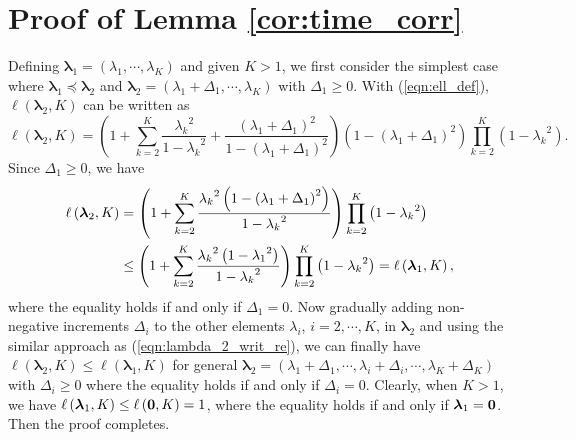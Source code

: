 \documentclass[12pt,onecolumn,draftcls]{IEEEtran}
\newcommand{\bs}{\boldsymbol}
\begin{document}
\section{Proof of Lemma \ref{cor:time_corr}} \label{app:proo_cor}
Defining ${\bs{\lambda }_1} = \left( {{\lambda _1}, \cdots,{\lambda _K}} \right)$ and given $K>1$, we first consider the simplest case where $\bs{\lambda}_1 \preceq \bs{\lambda}_2$ and ${\bs{\lambda }_2} = \left( {{\lambda _1}+ {\Delta _1}, \cdots ,{\lambda _K}} \right)$ with ${\Delta _1} \ge 0$. With (\ref{eqn:ell_def}), $\ell \left( {{\bs \lambda _2},K} \right)$ can be written as
\begin{equation}\label{eqn:ell_lambda_2_def}
\ell \left( {{\bs \lambda _2},K} \right) = \left( {1 + \sum\limits_{k = 2}^K {\frac{{{\lambda _k}^2}}{{1 - {\lambda _k}^2}}}  + \frac{{{{\left( {{\lambda _1} + {\Delta _1}} \right)}^2}}}{{1 - {{\left( {{\lambda _1} + {\Delta _1}} \right)}^2}}}} \right)\left( {1 - {{\left( {{\lambda _1} + {\Delta _1}} \right)}^2}} \right)\prod\limits_{k = 2}^K {\left( {1 - {\lambda _k}^2} \right)}.
\end{equation}
Since ${\Delta _1} \ge 0$, we have
\begin{align}\label{eqn:lambda_2_writ_re}
\ell \left( {{\bs \lambda _2},K} \right) &= \left( {1 + \sum\limits_{k = 2}^K {\frac{{{\lambda _k}^2\left( {1 - {{\left( {{\lambda _1} + {\Delta _1}} \right)}^2}} \right)}}{{1 - {\lambda _k}^2}}} } \right)\prod\limits_{k = 2}^K {\left( {1 - {\lambda _k}^2} \right)} \notag\\
 &\le \left( {1 + \sum\limits_{k = 2}^K {\frac{{{\lambda _k}^2\left( {1 - {\lambda _1}^2} \right)}}{{1 - {\lambda _k}^2}}} } \right)\prod\limits_{k = 2}^K {\left( {1 - {\lambda _k}^2} \right)}
= \ell \left( {{\bs \lambda _1},K} \right),
\end{align}
where the equality holds if and only if ${\Delta _1} = 0$. Now gradually adding non-negative increments $\Delta_i$ to the other elements $\lambda_i$, $i=2, \cdots, K$, in ${\bs \lambda _2}$ and using the similar approach as (\ref{eqn:lambda_2_writ_re}), we can finally have $\ell \left( {{\bs \lambda _2},K} \right) \le \ell \left( {{\bs \lambda _1},K} \right)$ for general ${\bs{\lambda }_2} = \left( {{\lambda _1}+ {\Delta _1}, \cdots, {\lambda _i}+{\Delta _i}, \cdots,{\lambda _K}+{\Delta _K}} \right)$ with ${\Delta _i} \ge 0$ where the equality holds if and only if ${\Delta _i} =0$. Clearly, when $K > 1$, we have $\ell \left( {{\bs \lambda _1},K} \right) \le \ell \left( {{\bf 0},K} \right)=1$, where the equality holds if and only if ${\bs \lambda _1} = {\bf 0}$. Then the proof completes.
\end{document}
